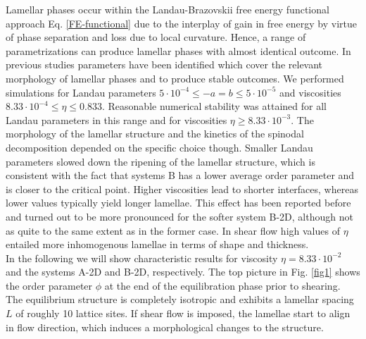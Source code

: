 \documentclass[8.5pt,twoside,twocolumn]{article}
\newcommand{\e}[1]{\cdot10^{#1}}
\begin{document}
Lamellar phases occur within the Landau-Brazovskii free energy functional approach Eq. \ref{FE-functional} due to the interplay of gain in free energy by virtue of phase separation and loss due to local curvature.
Hence, a range of parametrizations can produce lamellar phases with almost identical outcome.
In previous studies \cite{Kendon01,Kumaran2001,Xu03, Xu06b,Kumaran2011} parameters have been identified which cover the relevant morphology of lamellar phases and to produce stable outcomes. 
We performed simulations for Landau parameters $5\cdot10^{-4}\le-a=b\le5\cdot10^{-5}$ and viscosities $8.33\cdot10^{-4}\le\eta\le 0.833$.
Reasonable numerical stability was attained for all Landau parameters in this range and for viscosities $\eta\ge 8.33\e{-3}$.
The morphology of the lamellar structure and the kinetics of the spinodal decomposition depended on the specific choice though.
Smaller Landau parameters slowed down the ripening of the lamellar structure, which is consistent with the fact that systems B has a lower average order parameter and is closer to the critical point.
Higher viscosities lead to shorter interfaces, whereas lower values typically yield longer lamellae.
This effect has been reported before \cite{Gonnella97} and turned out to be more pronounced for the softer system B-2D, although not as quite to the same extent as in the former case.
In shear flow high values of $\eta$ entailed more inhomogenous lamellae in terms of shape and thickness.\\
In the following we will show characteristic results for viscosity $\eta=8.33\e{-2}$ and the systems A-2D and B-2D, respectively.
The top picture in Fig. \ref{fig1} shows the order parameter $\phi$ at the end of the equilibration phase prior to shearing.
The equilibrium structure is completely isotropic and exhibits a lamellar spacing $L$ of roughly 10 lattice sites.
If shear flow is imposed, the lamellae start to align in flow direction, which induces a morphological changes to the structure.
\end{document}

